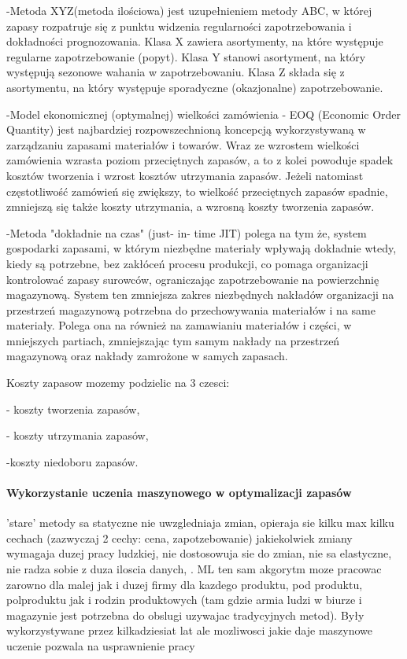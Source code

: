-Metoda XYZ(metoda ilościowa) jest uzupełnieniem metody ABC, w której zapasy rozpatruje się z punktu widzenia regularności zapotrzebowania i dokładności prognozowania. Klasa X zawiera asortymenty, na które występuje regularne zapotrzebowanie (popyt). Klasa Y stanowi asortyment, na który występują sezonowe wahania w zapotrzebowaniu. Klasa Z składa się z asortymentu, na który występuje sporadyczne (okazjonalne) zapotrzebowanie. 

-Model ekonomicznej (optymalnej) wielkości zamówienia - EOQ (Economic Order Quantity) jest najbardziej rozpowszechnioną koncepcją wykorzystywaną w zarządzaniu zapasami materiałów i towarów. Wraz ze wzrostem wielkości zamówienia wzrasta poziom przeciętnych zapasów, a to z kolei powoduje spadek kosztów tworzenia i wzrost kosztów utrzymania zapasów. Jeżeli natomiast częstotliwość zamówień się zwiększy, to wielkość przeciętnych zapasów spadnie, zmniejszą się także koszty utrzymania, a wzrosną koszty tworzenia zapasów. 

-Metoda "dokładnie na czas" (just- in- time JIT) polega na tym że, system gospodarki zapasami, w którym niezbędne materiały wpływają dokładnie wtedy, kiedy są potrzebne, bez zakłóceń procesu produkcji, co pomaga organizacji kontrolować zapasy surowców, ograniczając zapotrzebowanie na powierzchnię magazynową. System ten zmniejsza zakres niezbędnych nakładów organizacji na przestrzeń magazynową potrzebna do przechowywania materiałów i na same materiały. Polega ona na również na zamawianiu materiałów i części, w mniejszych partiach, zmniejszając tym samym nakłady na przestrzeń magazynową oraz nakłady zamrożone w samych zapasach. 


Koszty zapasow mozemy podzielic na 3 czesci:


   - koszty tworzenia zapasów,
   
   - koszty utrzymania zapasów,
    
  -koszty niedoboru zapasów.
 
\cite{enc2023}\cite{Prav2020}


\paragraph{Wykorzystanie uczenia maszynowego w optymalizacji zapasów}
'stare' metody sa statyczne nie uwzgledniaja zmian, opieraja sie kilku max kilku cechach (zazwyczaj 2 cechy: cena, zapotzebowanie) jakiekolwiek zmiany wymagaja duzej pracy ludzkiej, nie dostosowuja sie do zmian, nie sa elastyczne, nie radza sobie z duza iloscia danych, . ML ten sam akgorytm moze pracowac zarowno dla malej jak i duzej firmy dla kazdego produktu, pod produktu, polproduktu jak i rodzin produktowych (tam gdzie armia ludzi w biurze i magazynie jest potrzebna do obslugi uzywajac tradycyjnych metod). Były wykorzystywane przez kilkadziesiat lat ale mozliwosci jakie daje maszynowe uczenie pozwala na usprawnienie pracy

